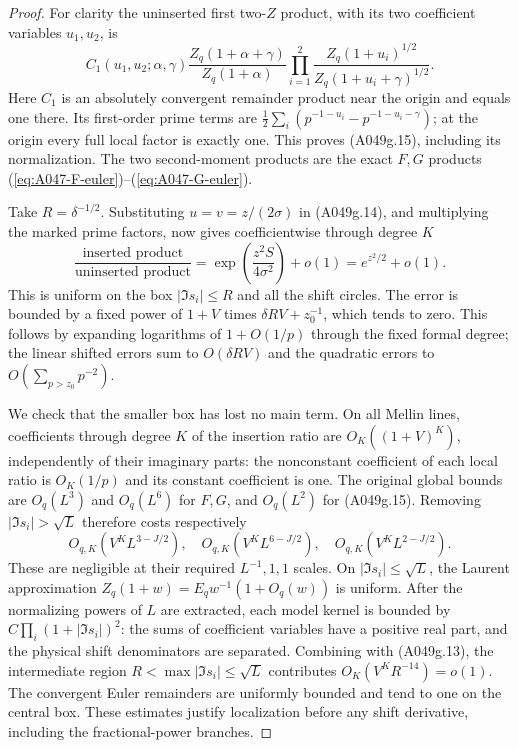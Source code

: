 \begin{proof}
For clarity the uninserted first two-$Z$ product, with its two
coefficient variables $u_1,u_2$, is
\[
 C_1(u_1,u_2;\alpha,\gamma)
 \frac{Z_q(1+\alpha+\gamma)}{Z_q(1+\alpha)}
 \prod_{i=1}^2
       \frac{Z_q(1+u_i)^{1/2}}{Z_q(1+u_i+\gamma)^{1/2}}.
\tag{A049g.15}
\]
Here $C_1$ is an absolutely convergent remainder product near
the origin and equals one there. Its first-order prime terms
are $\frac12\sum_i(p^{-1-u_i}-p^{-1-u_i-\gamma})$;
at the origin every full local factor is exactly one. This
proves (A049g.15), including its normalization. The two
second-moment products are the exact $F,G$ products
(\ref{eq:A047-F-euler})--(\ref{eq:A047-G-euler}).

Take $R=\delta^{-1/2}$. Substituting
$u=v=z/(2\sigma)$ in (A049g.14), and multiplying the marked
prime factors, now gives coefficientwise through degree $K$
\[
 \frac{\text{inserted product}}{\text{uninserted product}}
    =\exp\left(\frac{z^2S}{4\sigma^2}\right)+o(1)
    =e^{z^2/2}+o(1).
\tag{A049g.16}
\]
This is uniform on the box $|\Im s_i|\le R$ and all the shift
circles. The error is bounded by a fixed power of $1+V$ times
$\delta R V+z_0^{-1}$, which tends to zero. This follows by
expanding logarithms of $1+O(1/p)$ through the fixed formal
degree; the linear shifted errors sum to $O(\delta RV)$ and
the quadratic errors to $O(\sum_{p>z_0}p^{-2})$.

We check that the smaller box has lost no main term. On all
Mellin lines, coefficients through degree $K$ of the insertion
ratio are $O_K((1+V)^K)$, independently of their imaginary
parts: the nonconstant coefficient of each local ratio is
$O_K(1/p)$ and its constant coefficient is one. The original
global bounds are $O_q(L^3)$ and $O_q(L^6)$ for $F,G$, and
$O_q(L^2)$ for (A049g.15). Removing $|\Im s_i|>\sqrt L$
therefore costs respectively
\[
 O_{q,K}(V^K L^{3-J/2}),\quad
 O_{q,K}(V^K L^{6-J/2}),\quad
 O_{q,K}(V^K L^{2-J/2}).
\]
These are negligible at their required $L^{-1},1,1$ scales.
On $|\Im s_i|\le\sqrt L$, the Laurent approximation
$Z_q(1+w)=E_qw^{-1}(1+O_q(w))$ is uniform. After the
normalizing powers of $L$ are extracted, each model kernel
is bounded by $C\prod_i(1+|\Im s_i|)^2$: the sums of
coefficient variables have a positive real part, and the
physical shift denominators are separated. Combining with
(A049g.13), the intermediate region
$R<\max|\Im s_i|\le\sqrt L$ contributes
$O_K(V^K R^{-14})=o(1)$. The convergent Euler remainders are
uniformly bounded and tend to one on the central box.
These estimates justify localization before any shift
derivative, including the fractional-power branches.


\end{proof}
